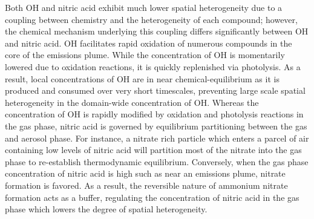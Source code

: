 \documentclass[acp]{copernicus}
\begin{document}
Both OH and nitric acid exhibit much lower spatial heterogeneity due to a 
coupling between chemistry and the heterogeneity of each compound; 
however, the chemical mechanism underlying this coupling differs significantly 
between OH and nitric acid. OH facilitates rapid oxidation of numerous compounds
in the core of the emissions plume. While the concentration of OH is momentarily 
lowered due to oxidation reactions, it is quickly replenished via photolysis. 
As a result, local concentrations of OH are in near chemical-equilibrium as
it is produced and consumed over very short timescales, preventing
large scale spatial heterogeneity in the domain-wide concentration of
OH. Whereas the concentration of OH is rapidly modified by oxidation and 
photolysis reactions in the gas phase, nitric acid is governed by equilibrium 
partitioning between the gas and aerosol phase. For instance, a nitrate rich 
particle which enters a parcel of air containing low levels of nitric acid will partition 
most of the nitrate into the gas phase to re-establish thermodynamic equilibrium.
Conversely, when the gas phase concentration of nitric acid is high such as near an 
emissions plume, nitrate formation is favored. As a result, the reversible nature of 
ammonium nitrate formation acts as a buffer, regulating the concentration of nitric acid 
in the gas phase which lowers the degree of spatial heterogeneity.




\end{document}
